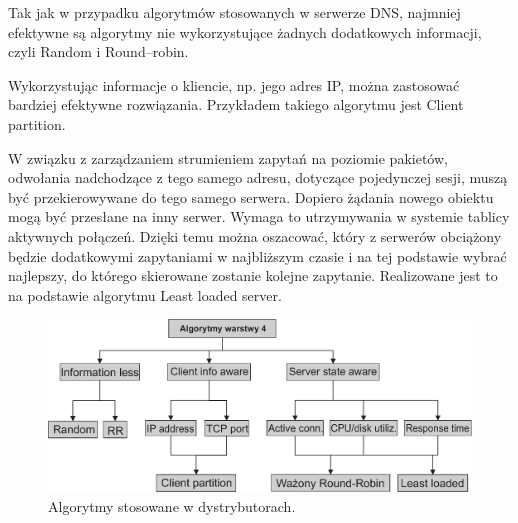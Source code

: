 Tak jak w przypadku algorytmów stosowanych w serwerze DNS, najmniej efektywne są algorytmy nie wykorzystujące żadnych 
dodatkowych informacji, czyli Random i Round--robin.

Wykorzystując informacje o kliencie, np. jego adres IP, można zastosować bardziej efektywne rozwiązania. Przykładem takiego 
algorytmu jest Client partition.

W związku z zarządzaniem strumieniem zapytań na poziomie pakietów, odwołania nadchodzące z tego samego adresu, dotyczące 
pojedynczej sesji, muszą być przekierowywane do tego samego serwera. Dopiero żądania nowego obiektu mogą być przesłane na inny 
serwer. Wymaga to utrzymywania w systemie tablicy aktywnych połączeń. Dzięki temu można oszacować, który z serwerów obciążony 
będzie dodatkowymi zapytaniami w najbliższym czasie i na tej podstawie wybrać najlepszy, do którego skierowane zostanie 
kolejne zapytanie. Realizowane jest to na podstawie algorytmu Least loaded server. 
\begin{figure}[h]
\centering
\includegraphics[width=4.9in]{./rysunki/level_4_alg.eps}
\caption{Algorytmy stosowane w dystrybutorach.}
\label{level_4_alg}
\end{figure}

